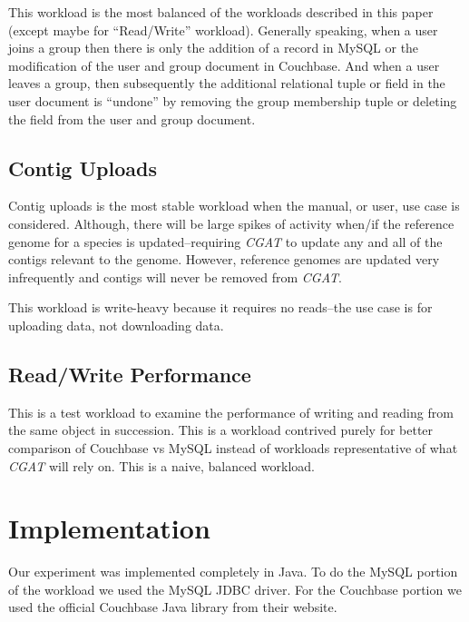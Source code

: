 \documentclass[10pt, conference, compsocconf]{IEEEtran}
\begin{document}
This workload is the most balanced of the workloads described in this paper
(except maybe for ``Read/Write'' workload). Generally speaking, when a user joins a
group then there is only the addition of a record in MySQL or the modification
of the user and group document in Couchbase. And when a user leaves a group, then
subsequently the additional relational tuple or field in the user document is
``undone'' by removing the group membership tuple or deleting the field from
the user and group document.

\subsection{Contig Uploads}
Contig uploads is the most stable workload when the manual, or user, use case
is considered. Although, there will be large spikes of activity when/if the
reference genome for a species is updated--requiring \textit{CGAT} to update
any and all of the contigs relevant to the genome. However, reference genomes
are updated very infrequently and contigs will never be removed from
\textit{CGAT}.

This workload is write-heavy because it requires no reads--the use case is for
uploading data, not downloading data.

\subsection{Read/Write Performance}
This is a test workload to examine the performance of writing and reading from
the same object in succession. This is a workload contrived purely for better
comparison of Couchbase vs MySQL instead of workloads representative of what
\textit{CGAT} will rely on. This is a naive, balanced workload.

\section{Implementation}\label{sec:implementation}
Our experiment was implemented completely in Java. To do the MySQL portion of
the workload we used the MySQL JDBC driver. For the Couchbase portion we used
the official Couchbase Java library from their website.
\end{document}
